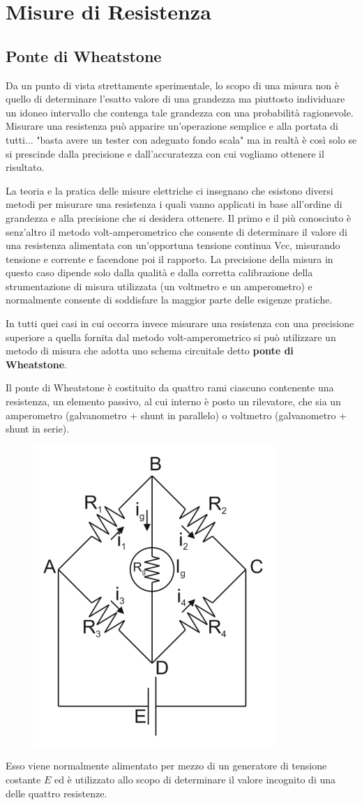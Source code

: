 \documentclass[a4paper, 15pt]{article}
\begin{document}
\section{Misure di Resistenza}	
\subsection{Ponte di Wheatstone}	
\begin{adjustwidth}{2in}{}
		Da un punto di vista strettamente sperimentale, lo scopo di una misura non è quello di determinare l'esatto valore di una grandezza ma piuttosto individuare un idoneo intervallo che contenga tale grandezza con una probabilità ragionevole.
		Misurare una resistenza può apparire un'operazione semplice e alla portata di tutti... "basta avere un tester con adeguato fondo scala" ma in realtà è così solo se si prescinde dalla precisione e dall'accuratezza con cui vogliamo ottenere il risultato.
		
		La teoria e la pratica delle misure elettriche ci insegnano che esistono diversi metodi per misurare una resistenza i quali vanno applicati in base all'ordine di grandezza e alla precisione che si desidera ottenere.
		Il primo e il più conosciuto è senz'altro il metodo volt-amperometrico che consente di determinare il valore di una resistenza alimentata con un'opportuna tensione continua Vcc, misurando tensione e corrente e facendone poi il rapporto. La precisione della misura in questo caso dipende solo dalla qualità e dalla corretta calibrazione della strumentazione di misura utilizzata (un voltmetro e un amperometro) e normalmente consente di soddisfare la maggior parte delle esigenze pratiche.\newline
		
		In tutti quei casi in cui occorra invece misurare una resistenza con una precisione superiore a quella fornita dal metodo volt-amperometrico si può utilizzare un metodo di misura che adotta uno schema circuitale detto \textbf{ponte di Wheatstone}.\newline 
		
		Il ponte di Wheatstone è costituito da quattro rami ciascuno contenente una resistenza, un elemento passivo, al cui interno è posto un rilevatore, che sia un amperometro (galvanometro + shunt in parallelo) o voltmetro (galvanometro + shunt in serie).
\begin{figure}[H]
	\centering
	\includegraphics[width=0.2\linewidth]{fig/screenshot011}
	\label{fig:screenshot011}
\end{figure}
		Esso viene normalmente alimentato per mezzo di un generatore di tensione costante $E$ ed è utilizzato allo scopo di determinare il valore incognito di una delle quattro resistenze.\newline 
		

\end{adjustwidth}
\end{document}
